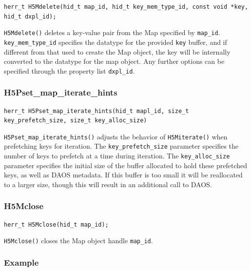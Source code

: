 {
\begin{lstlisting}
herr_t H5Mdelete(hid_t map_id, hid_t key_mem_type_id, const void *key, hid_t dxpl_id);
\end{lstlisting}
}

\verb+H5Mdelete()+ deletes a key-value pair from the Map specified by \verb+map_id+. \verb+key_mem_type_id+ specifies the datatype for the provided \verb+key+ buffer, and if different from that used to create the Map object, the key will be internally converted to the datatype for the map object. Any further options can be specified through the property list \verb+dxpl_id+.

\subsubsection{H5Pset\_map\_iterate\_hints}

{
\begin{lstlisting}
herr_t H5Pset_map_iterate_hints(hid_t mapl_id, size_t key_prefetch_size, size_t key_alloc_size)
\end{lstlisting}
}

\verb+H5Pset_map_iterate_hints()+ adjusts the behavior of \verb+H5Miterate()+ when prefetching keys for iteration. The \verb+key_prefetch_size+ parameter specifies the number of keys to prefetch at a time during iteration. The \verb+key_alloc_size+ parameter specifies the initial size of the buffer allocated to hold these prefetched keys, as well as DAOS metadata. If this buffer is too small it will be reallocated to a larger size, though this will result in an additional call to DAOS.

\subsubsection{H5Mclose}

{
\begin{lstlisting}
herr_t H5Mclose(hid_t map_id);
\end{lstlisting}
}

\verb+H5Mclose()+ closes the Map object handle \verb+map_id+.

\subsubsection{Example}

